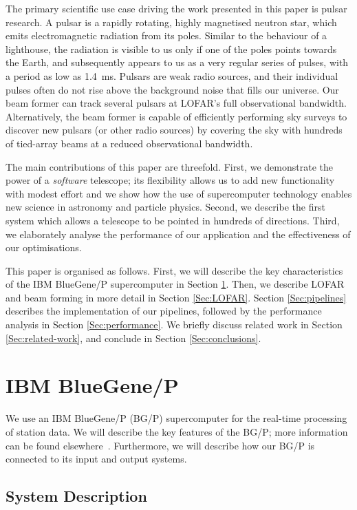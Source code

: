 \documentclass{llncs}
\begin{document}
The primary scientific use case driving the work presented in this paper is pulsar research. A pulsar is a rapidly rotating, highly magnetised neutron star, which emits electromagnetic radiation from its poles. Similar to the behaviour of a lighthouse, the radiation is visible to us only if one of the poles points towards the Earth, and subsequently appears to us as a very regular series of pulses, with a period as low as 1.4~ms. Pulsars are weak radio sources, and their individual pulses often do not rise above the background noise that fills our universe. Our beam former can track several pulsars at LOFAR's full observational bandwidth. Alternatively, the beam former is capable of efficiently performing sky surveys to discover new pulsars (or other radio sources) by covering the sky with hundreds of tied-array beams at a reduced observational bandwidth.

The main contributions of this paper are threefold. First, we demonstrate the power of a \emph{software\/} telescope; its flexibility allows us to add new functionality with modest effort and we show how the use of supercomputer technology enables new science in astronomy and particle physics. Second, we describe the first system which allows a telescope to be pointed in hundreds of directions. Third, we elaborately analyse the performance of our application and the effectiveness of our optimisations. 

This paper is organised as follows. First, we will describe the key characteristics of the IBM BlueGene/P supercomputer in Section \ref{Sec:bluegene}. Then, we describe LOFAR and beam forming in more detail in Section \ref{Sec:LOFAR}. Section \ref{Sec:pipelines} describes the implementation of our pipelines, followed by the performance analysis in Section \ref{Sec:performance}. We briefly discuss related work in Section \ref{Sec:related-work}, and conclude in Section \ref{Sec:conclusions}.

\section{IBM BlueGene/P}
\label{Sec:bluegene}

We use an IBM BlueGene/P (BG/P) supercomputer for the real-time processing of station data. We will describe the key features of the BG/P; more information can be found elsewhere~\cite{IBM:08}. Furthermore, we will describe how our BG/P is connected to its input and output systems.

\subsection{System Description}
\end{document}
